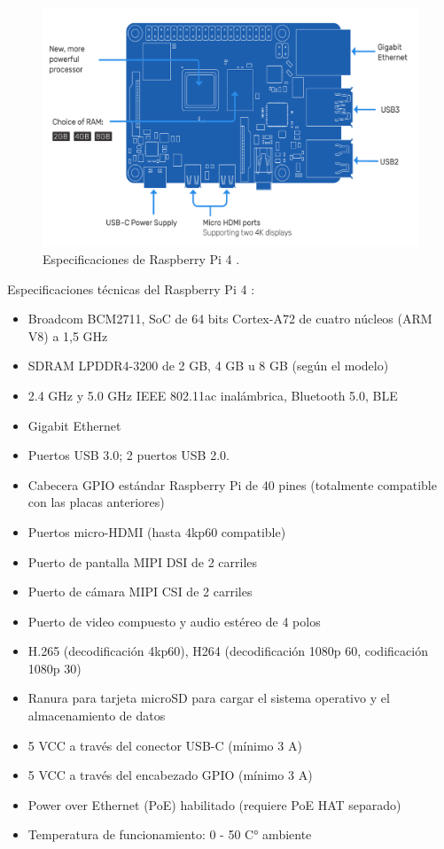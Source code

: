 \begin{figure}[htbp]
	\centering
	\includegraphics[width=.95\textwidth]{./Figures/rpi4.png}
	\caption{Especificaciones de Raspberry Pi 4 \protect\footnotemark. \citep{WEBSITE:7}}

	\label{fig:rpi4}
\end{figure}


Especificaciones técnicas del Raspberry Pi 4 \citep{WEBSITE:7}:

\begin{itemize}
\item Broadcom BCM2711, SoC de 64 bits Cortex-A72 de cuatro núcleos (ARM V8) a 1,5 GHz
\item SDRAM LPDDR4-3200 de 2 GB, 4 GB u 8 GB (según el modelo)
\item 2.4 GHz y 5.0 GHz IEEE 802.11ac inalámbrica, Bluetooth 5.0, BLE
\item Gigabit Ethernet
\item Puertos USB 3.0; 2 puertos USB 2.0.
\item Cabecera GPIO estándar Raspberry Pi de 40 pines (totalmente compatible con las placas anteriores)
\item Puertos micro-HDMI (hasta 4kp60 compatible)
\item Puerto de pantalla MIPI DSI de 2 carriles
\item Puerto de cámara MIPI CSI de 2 carriles
\item Puerto de video compuesto y audio estéreo de 4 polos
\item H.265 (decodificación 4kp60), H264 (decodificación 1080p 60, codificación 1080p 30)
\item Ranura para tarjeta microSD para cargar el sistema operativo y el almacenamiento de datos
\item 5 VCC a través del conector USB-C (mínimo 3 A)
\item 5 VCC a través del encabezado GPIO (mínimo 3 A)
\item Power over Ethernet (PoE) habilitado (requiere PoE HAT separado)
\item Temperatura de funcionamiento: 0 - 50 C° ambiente
\end{itemize}


